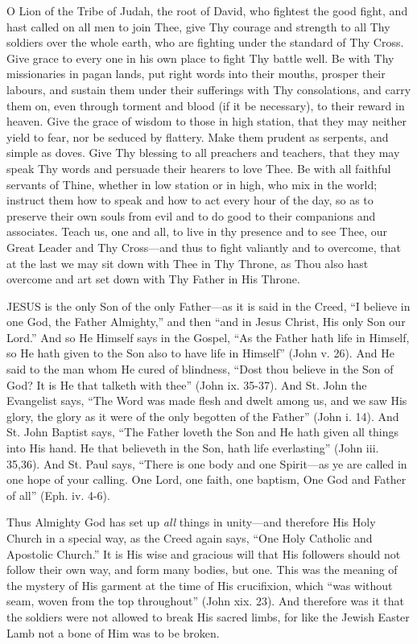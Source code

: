 O Lion of the Tribe of Judah,
the root of David, who fightest the good fight, and hast called on all
men to join Thee, give Thy courage and strength to all Thy soldiers over
the whole earth, who are fighting under the standard of Thy Cross. Give
grace to every one in his own place to fight Thy battle well. Be with
Thy missionaries in pagan lands, put right words into their mouths,
prosper their labours, and sustain them under their sufferings with Thy
consolations, and carry them on, even through torment and blood (if it
be necessary), to their reward in heaven. Give the grace of wisdom to
those in high station, that they may neither yield to fear, nor be
seduced by flattery. Make them prudent as serpents, and simple as doves.
Give Thy blessing to all preachers and teachers, that they may speak Thy
words and persuade their hearers to love Thee. Be with all faithful
servants of Thine, whether in low station or in high, who mix in
the world; instruct them how to speak and how to act every hour of the
day, so as to preserve their own souls from evil and to do good to their
companions and associates. Teach us, one and all, to live in thy
presence and to see Thee, our Great Leader and Thy Cross—and thus to
fight valiantly and to overcome, that at the last we may sit down with
Thee in Thy Throne, as Thou also hast overcome and art set down with Thy
Father in His Throne.


JESUS is the only Son
of the only Father—as it is said in the Creed, ``I believe in one God,
the Father Almighty,'' and then ``and in Jesus Christ, His only Son our
Lord.'' And so He Himself says in the Gospel, ``As the Father hath life in
Himself, so He hath given to the Son also to have life in Himself''
(John v. 26). And He said to the man whom He cured of blindness, ``Dost
thou believe in the Son of God? It is He that talketh with thee'' (John
ix. 35-37). And St. John the Evangelist says, ``The Word was made flesh
and dwelt among us, and we saw His glory, the glory as it were of the
only begotten of the Father'' (John i. 14). And St. John Baptist says, ``The
Father loveth the Son and He hath given all things into His hand. He
that believeth in the Son, hath life everlasting'' (John iii. 35,\emph{}36).
And St. Paul says, ``There is one body and one Spirit—as ye are called
in one hope of your calling. One Lord, one faith, one baptism, One God
and Father of all'' (Eph. iv. 4-6).

Thus Almighty God has set up \emph{all}
things in unity—and therefore His Holy Church in a special way, as the
Creed again says, ``One Holy Catholic and Apostolic Church.'' It is His
wise and gracious will that His followers should not follow their own
way, and form many bodies, but one. This was the meaning of the mystery
of His garment at the time of His crucifixion, which ``was without
seam, woven from the top throughout'' (John xix. 23). And therefore was
it that the soldiers were not allowed to break His sacred limbs, for
like the Jewish Easter Lamb not a bone of Him was to be broken.

